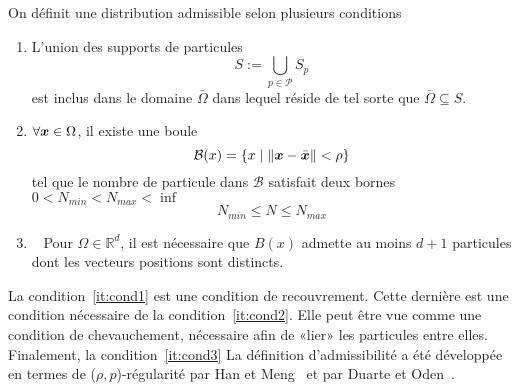 \begin{definition}
    On définit une distribution admissible selon plusieurs conditions
    \begin{enumerate}
        \item L'union des supports de particules~\label{it:cond1}
              \begin{equation*}
                  S:= \bigcup_{p \in \mathcal P} S_p
              \end{equation*}
              est inclus dans le domaine $\bar \Omega$ dans lequel réside de tel sorte que $\bar \Omega	\subseteq S$.
        \item $\forall \bm{x} \in \Omega$, il existe une boule~\label{it:cond2}
              \begin{equation*}
                  \mathcal B(x) = \{x \mid \|\bm{x} - \bar {\bm{x}}\| < \rho\}
              \end{equation*}tel que le nombre de particule dans $\mathcal B$ satisfait deux bornes $0 < N_{min} < N_{max} < \inf$
              \begin{equation*}
                  N_{min} \leq N \leq N_{max}
              \end{equation*}%
              \item~\label{it:cond3} Pour $\Omega \in \mathbb R^d$, il est nécessaire que $B(x)$ admette au moins $d+1$ particules dont les vecteurs positions sont distincts.%
    \end{enumerate}
\end{definition}

La condition~\ref{it:cond1} est une condition de recouvrement. Cette dernière est une condition nécessaire de la condition~\ref{it:cond2}. Elle peut être vue comme une condition de chevauchement, nécessaire afin de «lier» les particules entre elles. Finalement, la condition~\ref{it:cond3}
La définition d'admissibilité a été développée en termes de ($\rho, p$)-régularité par Han et Meng~\cite{HAN20016157} et par Duarte et Oden~\cite{duarte1996hp}.

